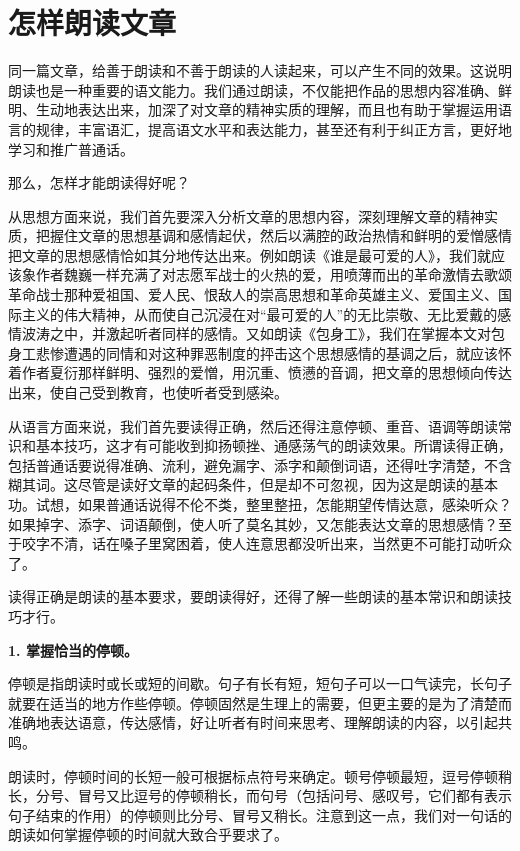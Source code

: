 \section{怎样朗读文章}

同一篇文章，给善于朗读和不善于朗读的人读起来，可以产生不同的效果。这说明朗读也是一种重要的语文能力。我们通过朗读，不仅能把作品的思想内容准确、鲜明、生动地表达出来，加深了对文章的精神实质的理解，而且也有助于掌握运用语言的规律，丰富语汇，提高语文水平和表达能力，甚至还有利于纠正方言，更好地学习和推广普通话。

那么，怎样才能朗读得好呢？

从思想方面来说，我们首先要深入分析文章的思想内容，深刻理解文章的精神实质，把握住文章的思想基调和感情起伏，然后以满腔的政治热情和鲜明的爱憎感情把文章的思想感情恰如其分地传达出来。例如朗读《谁是最可爱的人》，我们就应该象作者魏巍一样充满了对志愿军战士的火热的爱，用喷薄而出的革命激情去歌颂革命战士那种爱祖国、爱人民、恨敌人的崇高思想和革命英雄主义、爱国主义、国际主义的伟大精神，从而使自己沉浸在对“最可爱的人”的无比崇敬、无比爱戴的感情波涛之中，并激起听者同样的感情。又如朗读《包身工》，我们在掌握本文对包身工悲惨遭遇的同情和对这种罪恶制度的抨击这个思想感情的基调之后，就应该怀着作者夏衍那样鲜明、强烈的爱憎，用沉重、愤懑的音调，把文章的思想倾向传达出来，使自己受到教育，也使听者受到感染。

从语言方面来说，我们首先要读得正确，然后还得注意停顿、重音、语调等朗读常识和基本技巧，这才有可能收到抑扬顿挫、通感荡气的朗读效果。所谓读得正确，包括普通话要说得准确、流利，避免漏字、添字和颠倒词语，还得吐字清楚，不含糊其词。这尽管是读好文章的起码条件，但是却不可忽视，因为这是朗读的基本功。试想，如果普通话说得不伦不类，整里整扭，怎能期望传情达意，感染听众？如果掉字、添字、词语颠倒，使人听了莫名其妙，又怎能表达文章的思想感情？至于咬字不清，话在嗓子里窝困着，使人连意思都没听出来，当然更不可能打动听众了。

读得正确是朗读的基本要求，要朗读得好，还得了解一些朗读的基本常识和朗读技巧才行。

\textbf{1. 掌握恰当的停顿。}

停顿是指朗读时或长或短的间歇。句子有长有短，短句子可以一口气读完，长句子就要在适当的地方作些停顿。停顿固然是生理上的需要，但更主要的是为了清楚而准确地表达语意，传达感情，好让听者有时间来思考、理解朗读的内容，以引起共鸣。

朗读时，停顿时间的长短一般可根据标点符号来确定。顿号停顿最短，逗号停顿稍长，分号、冒号又比逗号的停顿稍长，而句号（包括问号、感叹号，它们都有表示句子结束的作用）的停顿则比分号、冒号又稍长。注意到这一点，我们对一句话的朗读如何掌握停顿的时间就大致合乎要求了。


